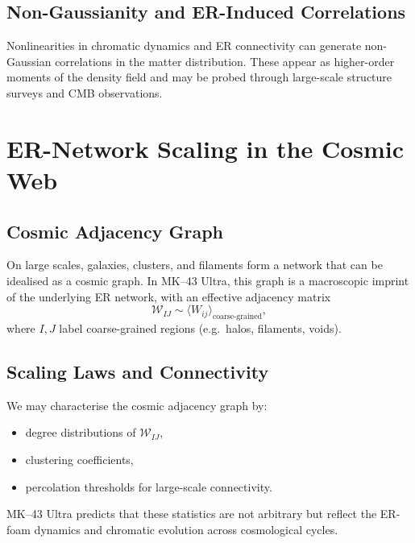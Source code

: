 \section{Non-Gaussianity and ER-Induced Correlations}

Nonlinearities in chromatic dynamics and ER connectivity can generate non-Gaussian correlations in the matter distribution.
These appear as higher-order moments of the density field and may be probed through large-scale structure surveys and CMB observations.


\chapter{ER-Network Scaling in the Cosmic Web}

\section{Cosmic Adjacency Graph}

On large scales, galaxies, clusters, and filaments form a network that can be idealised as a cosmic graph.
In MK--43 Ultra, this graph is a macroscopic imprint of the underlying ER network, with an effective adjacency matrix
\[
  \mathcal{W}_{IJ} \sim \langle W_{ij} \rangle_{\text{coarse-grained}},
\]
where $I,J$ label coarse-grained regions (e.g.\ halos, filaments, voids).

\section{Scaling Laws and Connectivity}

We may characterise the cosmic adjacency graph by:
\begin{itemize}
  \item degree distributions of $\mathcal{W}_{IJ}$,
  \item clustering coefficients,
  \item percolation thresholds for large-scale connectivity.
\end{itemize}
MK--43 Ultra predicts that these statistics are not arbitrary but reflect the ER-foam dynamics and chromatic evolution across cosmological cycles.

